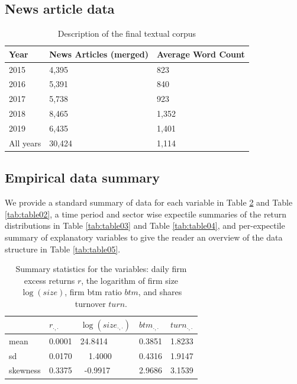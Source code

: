 \documentclass[11pt]{article}
\begin{document}
\hypertarget{news-article-data}{%
\subsection*{News article data}\label{news-article-data}}

\vspace{-0.5cm}
\begin{table}[ht!]

\caption{\label{tab:table00}Description of the final textual corpus}
\centering
\begin{tabular}[t]{l|l|l}
\hline
Year & News Articles (merged) & Average Word Count\\
\hline
2015 & 4,395 & 823\\
\hline
2016 & 5,391 & 840\\
\hline
2017 & 5,738 & 923\\
\hline
2018 & 8,465 & 1,352\\
\hline
2019 & 6,435 & 1,401\\
\hline
All years & 30,424 & 1,114\\
\hline
\end{tabular}
\end{table}


\hypertarget{empirical-data-summary}{%
\subsection*{Empirical data summary}\label{empirical-data-summary}}

We provide a standard summary of data for each variable in Table \ref{tab:table01} and Table \ref{tab:table02}, a time period and sector wise expectile summaries of the return distributions in Table \ref{tab:table03} and Table \ref{tab:table04}, and per-expectile summary of explanatory variables to give the reader an overview of the data structure in Table \ref{tab:table05}.

\begin{table}[h!]

\caption{\label{tab:table01}Summary statistics for the variables: daily firm excess returns $r$, the logarithm of firm size $\log(size)$, firm btm ratio $btm$, and shares turnover $turn$.}
\centering
\begin{tabular}[t]{l|l|l|l|l}
\hline
  & $r_{\cdot,\cdot}$ & $\log(size_{\cdot,\cdot})$ & $btm_{\cdot,\cdot}$ & $turn_{\cdot,\cdot}$\\
\hline
  mean & 0.0001 & 24.8414& 0.3851& 1.8233\\
\hline
  sd & 0.0170 & ~~1.4000 & 0.4316& 1.9147\\
\hline
  skewness & 0.3375 & ~-0.9917 & 2.9686 & 3.1539\\
\hline
\end{tabular}
\end{table}
\end{document}
